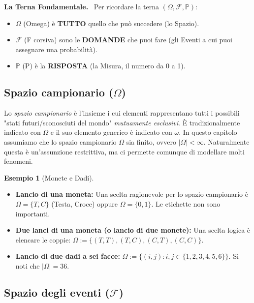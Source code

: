 \documentclass[11pt, a4paper]{report}
\theoremstyle{plain}
\theoremstyle{definition}
\newtheorem{esempio}[theorem]{Esempio}
\theoremstyle{remark}
\newenvironment{hint}[1][Hint]
{\begin{mdframed}[backgroundcolor=blue!5, linecolor=blue!50, linewidth=2pt, topline=false, rightline=false, bottomline=false]
\textbf{\textsf{#1.}}\ }
{\end{mdframed}}
\newcommand{\PP}{\mathbb{P}}
\newcommand{\F}{\mathcal{F}}
\newcommand{\1}{\mathbf{1}}
\begin{document}
\begin{hint}[La Terna Fondamentale]
    Per ricordare la terna $(\Omega, \F, \PP)$:
    \begin{itemize}
        \item $\Omega$ (Omega) è \textbf{TUTTO} quello che può succedere (lo Spazio).
        \item $\F$ (F corsiva) sono le \textbf{DOMANDE} che puoi fare (gli Eventi a cui puoi assegnare una probabilità).
        \item $\PP$ (P) è la \textbf{RISPOSTA} (la Misura, il numero da 0 a 1).
    \end{itemize}
\end{hint}

\subsection{Spazio campionario ($\Omega$)}

Lo \emph{spazio campionario} è l'insieme i cui elementi rappresentano tutti i possibili "stati futuri/sconosciuti del mondo" \emph{mutuamente esclusivi}. È tradizionalmente indicato con $\Omega$ e il suo elemento generico è indicato con $\omega$. In questo capitolo assumiamo che lo spazio campionario $\Omega$ sia finito, ovvero $|\Omega| < \infty$. Naturalmente questa è un'assunzione restrittiva, ma ci permette comunque di modellare molti fenomeni.

\begin{esempio}[Monete e Dadi]
    \begin{itemize}
        \item \textbf{Lancio di una moneta:} Una scelta ragionevole per lo spazio campionario è $\Omega = \{T, C\}$ (Testa, Croce) oppure $\Omega = \{0, 1\}$. Le etichette non sono importanti.
        \item \textbf{Due lanci di una moneta (o lancio di due monete):} Una scelta logica è elencare le coppie: $\Omega := \{(T, T), (T, C), (C, T), (C, C)\}$.
        \item \textbf{Lancio di due dadi a sei facce:} $\Omega := \{(i, j) : i, j \in \{1, 2, 3, 4, 5, 6\}\}$. Si noti che $|\Omega| = 36$.
    \end{itemize}
\end{esempio}

\subsection{Spazio degli eventi ($\F$)}
\end{document}
